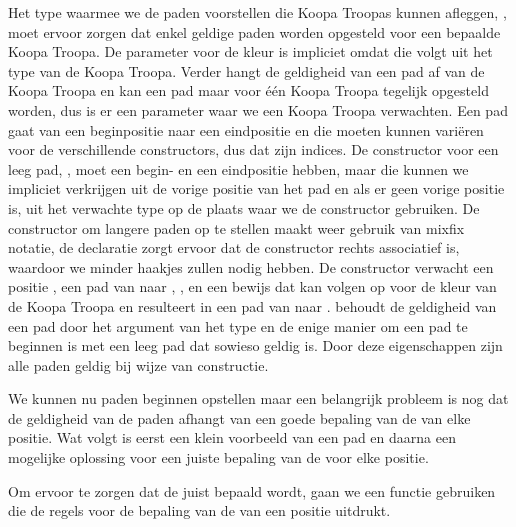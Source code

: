 
Het type waarmee we de paden voorstellen die Koopa Troopas kunnen afleggen,
, moet ervoor zorgen dat enkel geldige paden worden opgesteld voor
een bepaalde Koopa Troopa. De parameter voor de kleur is impliciet omdat die
volgt uit het type van de Koopa Troopa. Verder hangt de geldigheid van een pad
af van de Koopa Troopa en kan een pad maar voor één Koopa Troopa tegelijk
opgesteld worden, dus is er een parameter waar we een Koopa Troopa verwachten.
Een pad gaat van een beginpositie naar een eindpositie en die moeten kunnen
variëren voor de verschillende constructors, dus dat zijn indices. De
constructor voor een leeg pad, \iagda{[]}, moet een begin- en een eindpositie
hebben, maar die kunnen we impliciet verkrijgen uit de vorige positie van het
pad en als er geen vorige positie is, uit het verwachte type op de plaats waar
we de constructor gebruiken. De constructor om langere paden op te stellen
maakt weer gebruik van mixfix notatie, de  declaratie zorgt
ervoor dat de constructor rechts associatief is, waardoor we minder haakjes
zullen nodig hebben. De constructor verwacht een positie , een pad van
 naar , , en een bewijs dat  kan volgen op
 voor de kleur van de Koopa Troopa en resulteert in een pad van
 naar .  behoudt de geldigheid van een pad door
het argument van het type  en de enige manier om een pad te
beginnen is met een leeg pad dat sowieso geldig is. Door deze eigenschappen
zijn alle paden geldig bij wijze van constructie.

We kunnen nu paden beginnen opstellen maar een belangrijk probleem is nog dat
de geldigheid van de paden afhangt van een goede bepaling van de
 van elke positie. Wat volgt is eerst een klein voorbeeld van
een pad en daarna een mogelijke oplossing voor een juiste bepaling van de
 voor elke positie.


Om ervoor te zorgen dat de  juist bepaald wordt, gaan we een
functie gebruiken die de regels voor de bepaling van de  van
een positie uitdrukt.


